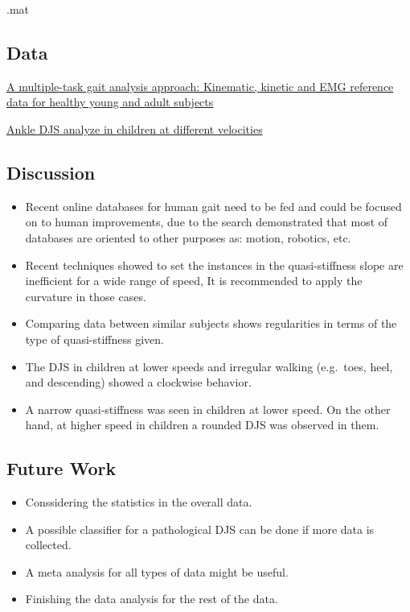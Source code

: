 \documentclass[11pt]{article}
\providecommand{\tightlist}{%
      \setlength{\itemsep}{0pt}\setlength{\parskip}{0pt}}
\begin{document}
.mat

    \hypertarget{data}{%
\subsection{Data}\label{data}}

\href{Ferrarin\%20Data-Presentation.ipynb}{A multiple-task gait analysis
approach: Kinematic, kinetic and EMG reference data for healthy young
and adult subjects}

\href{Stansfield-and-Schwaltz.ipynb}{Ankle DJS analyze in children at
different velocities}

    \hypertarget{discussion}{%
\subsection{Discussion}\label{discussion}}

\begin{itemize}
\item
  Recent online databases for human gait need to be fed and could be
  focused on to human improvements, due to the search demonstrated that
  most of databases are oriented to other purposes as: motion, robotics,
  etc.
\item
  Recent techniques showed to set the instances in the quasi-stiffness
  slope are inefficient for a wide range of speed, It is recommended to
  apply the curvature in those cases.
\item
  Comparing data between similar subjects shows regularities in terms of
  the type of quasi-stiffness given.
\item
  The DJS in children at lower speeds and irregular walking (e.g.~toes,
  heel, and descending) showed a clockwise behavior.
\item
  A narrow quasi-stiffness was seen in children at lower speed. On the
  other hand, at higher speed in children a rounded DJS was observed in
  them.
\end{itemize}

    \hypertarget{future-work}{%
\subsection{Future Work}\label{future-work}}

\begin{itemize}
\tightlist
\item
  Conssidering the statistics in the overall data.
\item
  A possible classifier for a pathological DJS can be done if more data
  is collected.
\item
  A meta analysis for all types of data might be useful.
\item
  Finishing the data analysis for the rest of the data.
\end{itemize}
\end{document}
